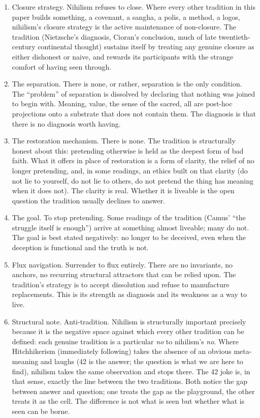 \documentclass[
]{article}
\begin{document}
\begin{enumerate}
\def\labelenumi{\arabic{enumi}.}
\setcounter{enumi}{147}
\item
  Closure strategy. Nihilism refuses to close. Where every other
  tradition in this paper builds something, a covenant, a sangha, a
  polis, a method, a logos, nihilism's closure strategy is the active
  maintenance of non-closure. The tradition (Nietzsche's diagnosis,
  Cioran's conclusion, much of late twentieth-century continental
  thought) sustains itself by treating any genuine closure as either
  dishonest or naive, and rewards its participants with the strange
  comfort of having seen through.
\item
  The separation. There is none, or rather, separation is the only
  condition. The ``problem'' of separation is dissolved by declaring
  that nothing was joined to begin with. Meaning, value, the sense of
  the sacred, all are post-hoc projections onto a substrate that does
  not contain them. The diagnosis is that there is no diagnosis worth
  having.
\item
  The restoration mechanism. There is none. The tradition is
  structurally honest about this: pretending otherwise is held as the
  deepest form of bad faith. What it offers in place of restoration is a
  form of clarity, the relief of no longer pretending, and, in some
  readings, an ethics built on that clarity (do not lie to yourself, do
  not lie to others, do not pretend the thing has meaning when it does
  not). The clarity is real. Whether it is liveable is the open question
  the tradition usually declines to answer.
\item
  The goal. To stop pretending. Some readings of the tradition (Camus'
  ``the struggle itself is enough'') arrive at something almost
  liveable; many do not. The goal is best stated negatively: no longer
  to be deceived, even when the deception is functional and the truth is
  not.
\item
  Flux navigation. Surrender to flux entirely. There are no invariants,
  no anchors, no recurring structural attractors that can be relied
  upon. The tradition's strategy is to accept dissolution and refuse to
  manufacture replacements. This is its strength as diagnosis and its
  weakness as a way to live.
\item
  Structural note. Anti-tradition. Nihilism is structurally important
  precisely because it is the negative space against which every other
  tradition can be defined: each genuine tradition is a particular
  \emph{no} to nihilism's \emph{no}. Where Hitchhikerism (immediately
  following) takes the absence of an obvious meta-meaning and laughs (42
  is the answer; the question is what we are here to find), nihilism
  takes the same observation and stops there. The 42 joke is, in that
  sense, exactly the line between the two traditions. Both notice the
  gap between answer and question; one treats the gap as the playground,
  the other treats it as the cell. The difference is not what is seen
  but whether what is seen can be borne.
\end{enumerate}
\end{document}
